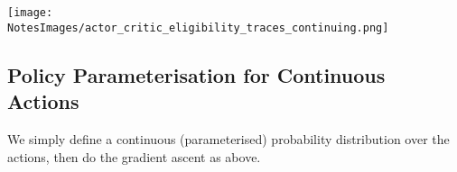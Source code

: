 \texttt{[image: \\NotesImages/actor\_critic\_eligibility\_traces\_continuing.png]}

\subsection{Policy Parameterisation for Continuous Actions}
We simply define a continuous (parameterised) probability distribution over the actions, then do the gradient ascent as above.








